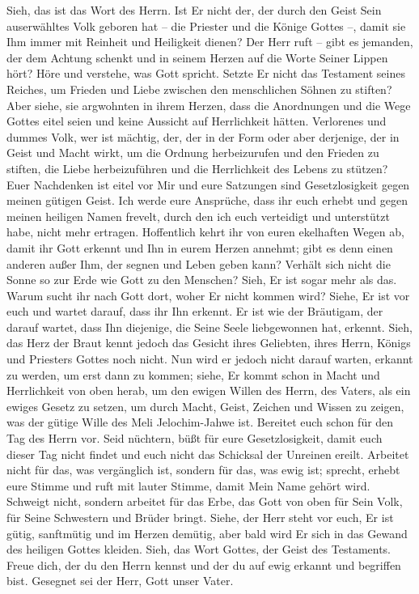         Sieh, das ist das Wort des Herrn. Ist Er nicht der, der durch den Geist Sein auserwähltes Volk geboren hat -- die Priester und die Könige Gottes --, damit sie Ihm immer mit Reinheit und Heiligkeit dienen? Der Herr ruft -- gibt es jemanden, der dem Achtung schenkt und in seinem Herzen auf die Worte Seiner Lippen hört? Höre und verstehe, was Gott spricht. Setzte Er nicht das Testament seines Reiches, um Frieden und Liebe zwischen den menschlichen Söhnen zu stiften? Aber siehe, sie argwohnten in ihrem Herzen, dass die Anordnungen und die Wege Gottes eitel seien und keine Aussicht auf Herrlichkeit hätten. Verlorenes und dummes Volk, wer ist mächtig, der, der in der Form oder aber derjenige, der in Geist und Macht wirkt, um die Ordnung herbeizurufen und den Frieden zu stiften, die Liebe herbeizuführen und die Herrlichkeit des Lebens zu stützen? Euer Nachdenken ist eitel vor Mir und eure Satzungen sind Gesetzlosigkeit gegen meinen gütigen Geist. Ich werde eure Ansprüche, dass ihr euch erhebt und gegen meinen heiligen Namen frevelt, durch den ich euch verteidigt und unterstützt habe, nicht mehr ertragen. Hoffentlich kehrt ihr von euren ekelhaften Wegen ab, damit ihr Gott erkennt und Ihn in eurem Herzen annehmt; gibt es denn einen anderen außer Ihm, der segnen und Leben geben kann? Verhält sich nicht die Sonne so zur Erde wie Gott zu den Menschen? Sieh, Er ist sogar mehr als das. Warum sucht ihr nach Gott dort, woher Er nicht kommen wird? Siehe, Er ist vor euch und wartet darauf, dass ihr Ihn erkennt. Er ist wie der Bräutigam, der darauf wartet, dass Ihn diejenige, die Seine Seele liebgewonnen hat, erkennt. Sieh, das Herz der Braut kennt jedoch das Gesicht ihres Geliebten, ihres Herrn, Königs und Priesters Gottes noch nicht. Nun wird er jedoch nicht darauf warten, erkannt zu werden, um erst dann zu kommen; siehe, Er kommt schon in Macht und Herrlichkeit von oben herab, um den ewigen Willen des Herrn, des Vaters, als ein ewiges Gesetz zu setzen, um durch Macht, Geist, Zeichen und Wissen zu zeigen, was der gütige Wille des Meli Jelochim-Jahwe ist. Bereitet euch schon für den Tag des Herrn vor. Seid nüchtern, büßt für eure Gesetzlosigkeit, damit euch dieser Tag nicht findet und euch nicht das Schicksal der Unreinen ereilt. Arbeitet nicht für das, was vergänglich ist, sondern für das, was ewig ist; sprecht, erhebt eure Stimme und ruft mit lauter Stimme, damit Mein Name gehört wird. Schweigt nicht, sondern arbeitet für das Erbe, das Gott von oben für Sein Volk, für Seine Schwestern und Brüder bringt. Siehe, der Herr steht vor euch, Er ist gütig, sanftmütig und im Herzen demütig, aber bald wird Er sich in das Gewand des heiligen Gottes kleiden. Sieh, das Wort Gottes, der Geist des Testaments. Freue dich, der du den Herrn kennst und der du auf ewig erkannt und begriffen bist. Gesegnet sei der Herr, Gott unser Vater. 
        
